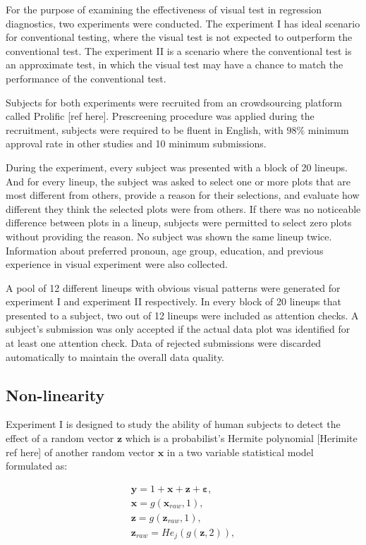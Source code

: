 \documentclass[]{interact}
\theoremstyle{plain}%
\theoremstyle{definition}
\theoremstyle{remark}
\begin{document}
For the purpose of examining the effectiveness of visual test in
regression diagnostics, two experiments were conducted. The experiment I
has ideal scenario for conventional testing, where the visual test is
not expected to outperform the conventional test. The experiment II is a
scenario where the conventional test is an approximate test, in which
the visual test may have a chance to match the performance of the
conventional test.

Subjects for both experiments were recruited from an crowdsourcing
platform called Prolific {[}ref here{]}. Prescreening procedure was
applied during the recruitment, subjects were required to be fluent in
English, with \(98\%\) minimum approval rate in other studies and 10
minimum submissions.

During the experiment, every subject was presented with a block of 20
lineups. And for every lineup, the subject was asked to select one or
more plots that are most different from others, provide a reason for
their selections, and evaluate how different they think the selected
plots were from others. If there was no noticeable difference between
plots in a lineup, subjects were permitted to select zero plots without
providing the reason. No subject was shown the same lineup twice.
Information about preferred pronoun, age group, education, and previous
experience in visual experiment were also collected.

A pool of 12 different lineups with obvious visual patterns were
generated for experiment I and experiment II respectively. In every
block of 20 lineups that presented to a subject, two out of 12 lineups
were included as attention checks. A subject's submission was only
accepted if the actual data plot was identified for at least one
attention check. Data of rejected submissions were discarded
automatically to maintain the overall data quality.

\hypertarget{non-linearity}{%
\subsection{Non-linearity}\label{non-linearity}}

Experiment I is designed to study the ability of human subjects to
detect the effect of a random vector \(\boldsymbol{z}\) which is a
probabilist's Hermite polynomial {[}Herimite ref here{]} of another
random vector \(\boldsymbol{x}\) in a two variable statistical model
formulated as:

\begin{align} \label{eq:nonlinearity-model}
\boldsymbol{y} = 1 + \boldsymbol{x} + \boldsymbol{z} + \boldsymbol{\varepsilon},\\
\boldsymbol{x} = g(\boldsymbol{x}_{raw}, 1), \\
\boldsymbol{z} = g(\boldsymbol{z}_{raw}, 1), \\
\boldsymbol{z}_{raw} = He_j(g(\boldsymbol{z}, 2)),
\end{align}
\end{document}
